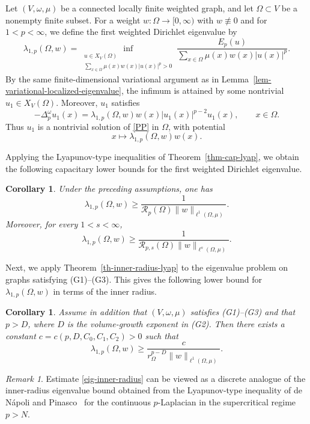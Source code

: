 \documentclass[twoside,12pt,letter]{article}
\theoremstyle{plain}
\newtheorem{corollary}[theorem]{Corollary}
\theoremstyle{definition}
\theoremstyle{remark}
\newtheorem{remark}[theorem]{Remark}
\numberwithin{equation}{section}
\begin{document}
Let \((V,\omega,\mu)\) be a connected locally finite weighted graph, and let
\(\Omega\subset V\) be a nonempty finite subset. For a weight
\(w:\Omega\to[0,\infty)\) with \(w\not\equiv0\) and for \(1<p<\infty\), we
define the first weighted Dirichlet eigenvalue by
\[
\lambda_{1,p}(\Omega,w)
=
\inf_{\substack{u\in X_V(\Omega)\\
\sum_{x\in\Omega}\mu(x)w(x)|u(x)|^p>0}}
\frac{E_p(u)}
{\displaystyle\sum_{x\in\Omega}\mu(x)w(x)|u(x)|^p}.
\]
By the same finite-dimensional variational argument as in
Lemma~\ref{lem-variational-localized-eigenvalue}, the infimum is attained by
some nontrivial \(u_1\in X_V(\Omega)\). Moreover, \(u_1\) satisfies
\[
-\Delta_p^\omega u_1(x)
=
\lambda_{1,p}(\Omega,w)w(x)|u_1(x)|^{p-2}u_1(x),
\qquad x\in\Omega.
\]
Thus \(u_1\) is a nontrivial solution of \eqref{PP} in \(\Omega\), with
potential
\[
x\mapsto \lambda_{1,p}(\Omega,w)w(x).
\]

Applying the Lyapunov-type inequalities of Theorem~\ref{thm-cap-lyap}, we
obtain the following capacitary lower bounds for the first weighted Dirichlet
eigenvalue.

\begin{corollary}\label{cor-weighted-eigen-cap}
Under the preceding assumptions, one has
\[
\lambda_{1,p}(\Omega,w)
\ge
\frac{1}{\mathcal{R}_p(\Omega)\|w\|_{\ell^1(\Omega,\mu)}}.
\]
Moreover, for every \(1<s<\infty\),
\[
\lambda_{1,p}(\Omega,w)
\ge
\frac{1}{\mathcal{R}_{p,s}(\Omega)\|w\|_{\ell^s(\Omega,\mu)}}.
\]
\end{corollary}


Next, we apply Theorem~\ref{th-inner-radius-lyap} to the eigenvalue problem on
graphs satisfying {\rm(G1)}--{\rm(G3)}. This gives the following lower bound
for \(\lambda_{1,p}(\Omega,w)\) in terms of the inner radius.

\begin{corollary}\label{cor-eigen-inner-radius}
Assume in addition that \((V,\omega,\mu)\) satisfies
{\rm(G1)}--{\rm(G3)} and that \(p>D\), where \(D\) is the volume-growth
exponent in {\rm(G2)}. Then there exists a constant
\(c=c(p,D,C_0,C_1,C_2)>0\) such that
\begin{equation}\label{eig-inner-radius}
\lambda_{1,p}(\Omega,w)
\ge
\frac{c}{r_\Omega^{p-D}\|w\|_{\ell^1(\Omega,\mu)}}.
\end{equation}
\end{corollary}

\begin{remark}
Estimate \eqref{eig-inner-radius} can be viewed as a discrete analogue of the
inner-radius eigenvalue bound obtained from the Lyapunov-type inequality of
de N\'apoli and Pinasco~\cite{deNapoliPinasco2016} for the continuous
\(p\)-Laplacian in the supercritical regime \(p>N\).
\end{remark}
\end{document}

